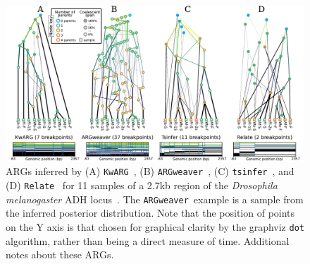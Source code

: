 \documentclass{article}
\newcommand{\tsinfer}[0]{\texttt{tsinfer}}
\newcommand{\kwarg}[0]{\texttt{KwARG}}
\newcommand{\argweaver}[0]{\texttt{ARGweaver}}
\newcommand{\relate}[0]{\texttt{Relate}}
\begin{document}
\begin{figure} \begin{center}
\includegraphics[width=\textwidth]{illustrations/inference.pdf} \end{center}
\caption{\label{fig-inferred-args} ARGs inferred by
(A) \kwarg~\citep{ignatieva2021kwarg},
(B) \argweaver~\citep{rasmussen2014genome,hubisz2020inference},
(C) \tsinfer~\citep{kelleher2019inferring},
and (D) \relate~\citep{speidel2019method}
for 11 samples of a 2.7kb region of the \textit{Drosophila melanogaster} ADH
locus~\citep{kreitman1983nucleotide}. The \argweaver\ example
is a sample from the inferred posterior distribution.
Note that the position of points on the
Y axis is that chosen for graphical clarity by the graphviz \texttt{dot}
algorithm,  rather than being
a direct measure of time. Additional notes about these ARGs.
}
\end{figure}
\end{document}
